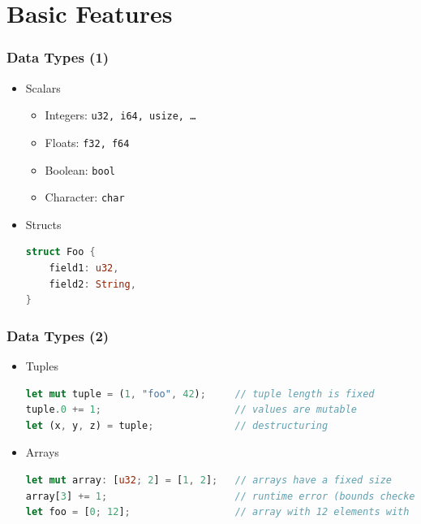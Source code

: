 \section{Basic Features}

\begin{frame}[fragile]
    \frametitle{Data Types (1)}

    \begin{itemize}
        \item Scalars
        \begin{itemize}
            \item Integers: \texttt{u32, i64, usize, \dots}
            \item Floats: \texttt{f32, f64}
            \item Boolean: \texttt{bool}
            \item Character: \texttt{char}
        \end{itemize}
        \item Structs
    \begin{lstlisting}[language=rust]
struct Foo {
    field1: u32,
    field2: String,
}
    \end{lstlisting}
    \end{itemize}
\end{frame}

\begin{frame}[fragile]
    \frametitle{Data Types (2)}

    \begin{itemize}
        \item Tuples
    \begin{lstlisting}[language=rust]
let mut tuple = (1, "foo", 42);     // tuple length is fixed
tuple.0 += 1;                       // values are mutable
let (x, y, z) = tuple;              // destructuring
    \end{lstlisting}
        \item Arrays
    \begin{lstlisting}[language=rust]
let mut array: [u32; 2] = [1, 2];   // arrays have a fixed size
array[3] += 1;                      // runtime error (bounds checked)
let foo = [0; 12];                  // array with 12 elements with value 0
    \end{lstlisting}
    \end{itemize}
\end{frame}

